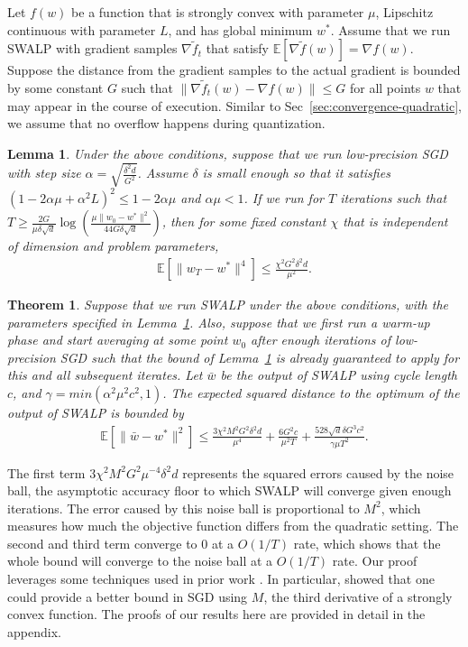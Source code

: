 \documentclass{article}
\newtheorem{theorem}{Theorem}
\newtheorem{lemma}{Lemma}
\begin{document}
Let $f(w)$ be a function that is strongly convex with parameter $\mu$, Lipschitz continuous with parameter $L$, and has global minimum $w^*$.
Assume that we run SWALP with gradient samples $\nabla \tilde f_t$ that satisfy $\mathbb{E}[\nabla \tilde f(w)] = \nabla f(w)$.
Suppose the distance from the gradient samples to the actual gradient is bounded by some constant $G$ such that $\|\nabla\tilde{f}_t(w) - \nabla f(w)\|\leq G$ for all points $w$ that may appear in the course of execution.
Similar to Sec~\ref{sec:convergence-quadratic}, we assume that no overflow happens during quantization.

\begin{lemma}
\label{lemmaNoiseBall}
Under the above conditions, 
suppose that we run low-precision SGD with step size $\alpha = \sqrt{\frac{\delta^2 d}{G^2}}$. 
Assume $\delta$ is small enough so that it satisfies $(1-2\alpha\mu+\alpha^2L)^2 \leq 1-2\alpha\mu$ and $\alpha\mu < 1$.
If we run for $T$ iterations such that   
$ T \geq \frac{2G}{\mu\delta\sqrt{d}}\log{\left( \frac{\mu\|w_0 - w^*\|^2}{44G\delta\sqrt{d}} \right)}$, 
then for some fixed constant $\chi$ that is independent of dimension and problem parameters, 
\begin{align*}
{\textstyle
\mathbb{E}[\|w_T - w^*\|^4] \leq \frac{\chi^2 G^2\delta^2d}{\mu^2}.
}
\end{align*}
\end{lemma}

\begin{theorem}
\label{thm:SWALP}
Suppose that we run SWALP under the above conditions, with the parameters specified in Lemma~\ref{lemmaNoiseBall}.
Also, suppose that we first run a warm-up phase and start averaging at some point $w_0$ after enough iterations of low-precision SGD such that the bound of Lemma~\ref{lemmaNoiseBall} is already guaranteed to apply for this and all subsequent iterates.
Let $\bar{w}$ be the output of SWALP using cycle length $c$, and $\gamma = min(\alpha^2\mu^2c^2,1)$.
The expected squared distance to the optimum of the output of SWALP is bounded by
\begin{align*}
{\textstyle
    \mathbb{E}[\|\bar{w} - w^*\|^2] \leq
    \frac{3 \chi^2 M^2G^2\delta^2 d}{\mu^4} + 
    \frac{6 G^2 c}{\mu^2 T} +
    \frac{528 \sqrt{d}\delta G^3 c^2}{\gamma\mu T^2}.
}
\end{align*}
\end{theorem}

The first term $3\chi^2M^2G^2 \mu^{-4} \delta^2 d$ represents the squared errors caused by the noise ball, the asymptotic accuracy floor to which SWALP will converge given enough iterations.
The error caused by this noise ball is proportional to $M^2$, which measures how much the objective function differs from the quadratic setting. 
The second and third term converge to $0$ at a $O(1/T)$ rate, which shows that the whole bound will converge to the noise ball at a $O(1/T)$ rate.
Our proof leverages some techniques used in prior work \cite{francisbach}. 
In particular, \citet{francisbach} showed that one could provide a better bound in SGD using $M$, the third derivative of a strongly convex function.
The proofs of our results here are provided in detail in the appendix.
\end{document}
